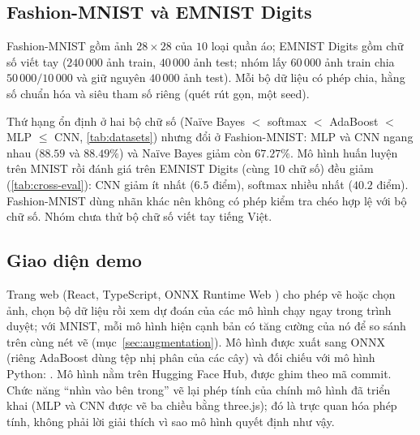 \subsection{Fashion-MNIST và EMNIST Digits}
\label{sec:datasets}
Fashion-MNIST \citep{xiao2017} gồm ảnh $28\times28$ của $10$ loại quần áo; EMNIST Digits \citep{cohen2017} gồm chữ số viết tay ($240\,000$ ảnh train, $40\,000$ ảnh test; nhóm lấy $60\,000$ ảnh train chia $50\,000/10\,000$ và giữ nguyên $40\,000$ ảnh test). Mỗi bộ dữ liệu có phép chia, hằng số chuẩn hóa và siêu tham số riêng (quét rút gọn, một seed).



Thứ hạng ổn định ở hai bộ chữ số (Naïve Bayes $<$ softmax $<$ AdaBoost $<$ MLP $\le$ CNN, \cref{tab:datasets}) nhưng đổi ở Fashion-MNIST: MLP và CNN ngang nhau ($88.59$ và $88.49\%$) và Naïve Bayes giảm còn $67.27\%$. Mô hình huấn luyện trên MNIST rồi đánh giá trên EMNIST Digits (cùng 10 chữ số) đều giảm (\cref{tab:cross-eval}): CNN giảm ít nhất ($6.5$ điểm), softmax nhiều nhất ($40.2$ điểm). Fashion-MNIST dùng nhãn khác nên không có phép kiểm tra chéo hợp lệ với bộ chữ số. Nhóm chưa thử bộ chữ số viết tay tiếng Việt.



\subsection{Giao diện demo}
\label{sec:demo}
Trang web (React, TypeScript, ONNX Runtime Web \citep{onnxruntime}) cho phép vẽ hoặc chọn ảnh, chọn bộ dữ liệu rồi xem dự đoán của các mô hình chạy ngay trong trình duyệt; với MNIST, mỗi mô hình hiện cạnh bản có tăng cường của nó để so sánh trên cùng nét vẽ (mục~\ref{sec:augmentation}). Mô hình được xuất sang ONNX (riêng AdaBoost dùng tệp nhị phân của các cây) và đối chiếu với mô hình Python: . Mô hình nằm trên Hugging Face Hub, được ghim theo mã commit. Chức năng ``nhìn vào bên trong'' vẽ lại phép tính của chính mô hình đã triển khai (MLP và CNN được vẽ ba chiều bằng three.js); đó là trực quan hóa phép tính, không phải lời giải thích vì sao mô hình quyết định như vậy.
